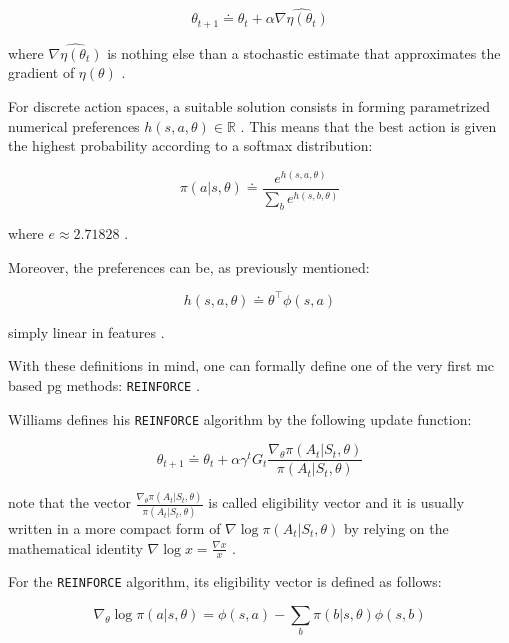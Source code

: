 \documentclass[draft=false]{seal_thesis}
\begin{document}
\begin{equation}
	\theta_{t+1} \doteq \theta_t + \alpha \widehat{\nabla \eta (\theta_t)}
\end{equation}

where $ \widehat{\nabla \eta (\theta_t)}$ is nothing else than a stochastic estimate that approximates the gradient of $\eta(\theta)$ \citep[p. 265]{Sutton2017}.

For discrete action spaces, a suitable solution consists in forming parametrized numerical preferences $h(s,a,\theta) \in \mathbb{R}$ \citep[p. 266]{Sutton2017}. This means that the best action is given the highest probability according to a softmax distribution:

\begin{equation}
\label{eq:probabilistic_preferences}
	\pi(a|s,\theta) \doteq \frac{e^{h(s,a,\theta)}}{\sum_b e^{h(s,b,\theta)}}
\end{equation}

where $e \approx 2.71828$ \citep[p. 266]{Sutton2017}.

Moreover, the preferences can be, as previously mentioned:

\begin{equation}
\label{eq:dot_preferences}
	h(s,a,\theta) \doteq \theta^\top \phi (s,a)
\end{equation}

simply linear in features \citep[p. 266]{Sutton2017}.

With these definitions in mind, one can formally define one of the very first \gls{mc} based \gls{pg} methods: \texttt{REINFORCE} \citep{Williams1992}.

Williams defines his \texttt{REINFORCE} algorithm by the following update function:

\begin{equation}
	\theta_{t+1} \doteq \theta_t + \alpha \gamma^t G_t \frac{\nabla_\theta \pi(A_t|S_t,\theta)}{\pi(A_t|S_t,\theta)}
\end{equation}

note that the vector $\frac{\nabla_\theta \pi(A_t|S_t,\theta)}{\pi(A_t|S_t,\theta)}$ is called eligibility vector and it is usually written in a more compact form of $\nabla \log \pi(A_t|S_t,\theta)$ by relying on the mathematical identity $\nabla \log x = \frac{\nabla x}{x}$ \citep[p. 271]{Sutton2017}.

For the \texttt{REINFORCE} algorithm, its eligibility vector is defined as follows:

\begin{equation}
	\nabla_\theta \log \pi (a|s,\theta) = \phi (s,a) - \sum_b \pi (b|s,\theta) \phi (s,b)
\end{equation}
\end{document}
